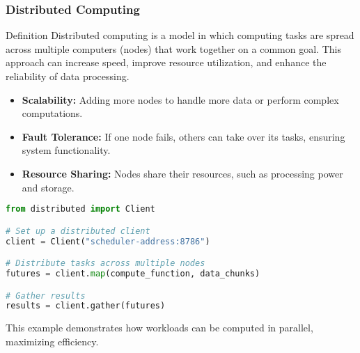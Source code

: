 \documentclass[aspectratio=169]{beamer}
\begin{document}
\begin{frame}[fragile]
    \frametitle{Distributed Computing}
    \begin{block}{Definition}
        Distributed computing is a model in which computing tasks are spread across multiple computers (nodes) that work together on a common goal.
        This approach can increase speed, improve resource utilization, and enhance the reliability of data processing.
    \end{block}
    
    \begin{itemize}
        \item \textbf{Scalability:} Adding more nodes to handle more data or perform complex computations.
        \item \textbf{Fault Tolerance:} If one node fails, others can take over its tasks, ensuring system functionality.
        \item \textbf{Resource Sharing:} Nodes share their resources, such as processing power and storage.
    \end{itemize}
    
    \begin{lstlisting}[language=Python]
from distributed import Client

# Set up a distributed client
client = Client("scheduler-address:8786")

# Distribute tasks across multiple nodes
futures = client.map(compute_function, data_chunks)

# Gather results
results = client.gather(futures)
    \end{lstlisting}
    
    This example demonstrates how workloads can be computed in parallel, maximizing efficiency.
\end{frame}
\end{document}
